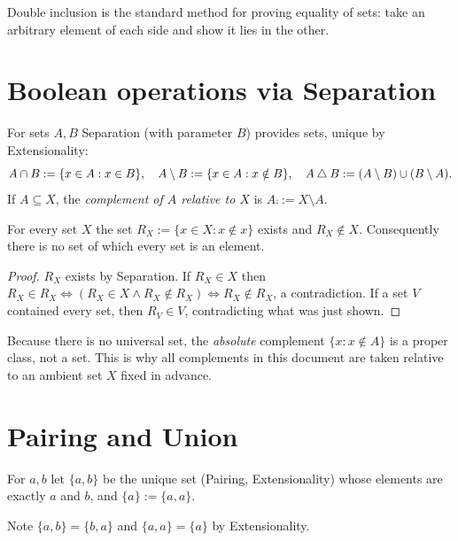 Double inclusion is the standard method for proving equality of sets: take an arbitrary element of each side and show it lies in the other.

\section{Boolean operations via Separation}

\begin{definition}
	For sets $A,B$ Separation (with parameter $B$) provides sets, unique by Extensionality:
	\[
	A\cap B:=\{x\in A:x\in B\},\quad A\setminus B:=\{x\in A:x\notin B\},\quad A\mathbin{\triangle} B:=(A\setminus B)\cup(B\setminus A).
	\]
	If $A\subseteq X$, the \emph{complement of $A$ relative to $X$} is $A\comp:=X\setminus A$.
\end{definition}

\begin{theorem}\label{thm:nouniversal}
	For every set $X$ the set $R_X:=\{x\in X:x\notin x\}$ exists and $R_X\notin X$. Consequently there is no set of which every set is an element.
\end{theorem}
\begin{proof}
	$R_X$ exists by Separation. If $R_X\in X$ then $R_X\in R_X\Leftrightarrow(R_X\in X\wedge R_X\notin R_X)\Leftrightarrow R_X\notin R_X$, a contradiction. If a set $V$ contained every set, then $R_V\in V$, contradicting what was just shown.
\end{proof}

\begin{remark}
	Because there is no universal set, the \emph{absolute} complement $\{x:x\notin A\}$ is a proper class, not a set. This is why all complements in this document are taken relative to an ambient set $X$ fixed in advance.
\end{remark}

\section{Pairing and Union}

\begin{definition}
	For $a,b$ let $\{a,b\}$ be the unique set (Pairing, Extensionality) whose elements are exactly $a$ and $b$, and $\{a\}:=\{a,a\}$.
\end{definition}

Note $\{a,b\}=\{b,a\}$ and $\{a,a\}=\{a\}$ by Extensionality.

